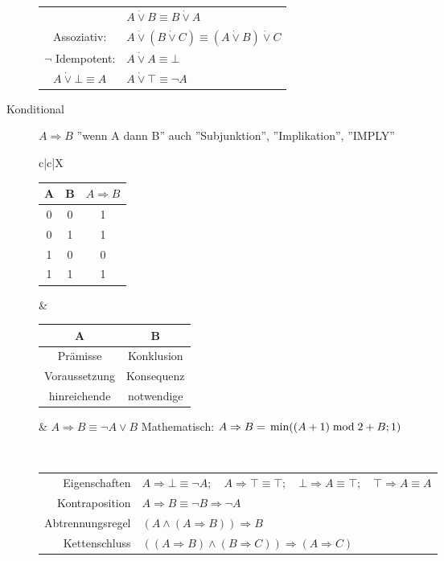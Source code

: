 \documentclass[12pt,a4paper]{article}
\begin{document}
\begin{description}
\begin{description}
\begin{tabularx}{\linewidth}{c|X}
\begin{tabular}[t]{ll}
						Kommutativ:                  & $A \dot{\vee} B \equiv B \dot{\vee} A$                               \\
						Assoziativ:                  & $A \dot{\vee} (B \dot{\vee} C) \equiv (A \dot{\vee} B) \dot{\vee} C$ \\
						$\neg$ Idempotent:           & $A \dot{\vee} A \equiv \bot$                                         \\
						$A \dot{\vee} \bot \equiv A$ & $A \dot{\vee} \top \equiv \neg A$
					\end{tabular} \\ \hline
				\end{tabularx}
			\item[Konditional] $A\Rightarrow B$ ''wenn A dann B'' auch ''Subjunktion'', ''Implikation'', ''IMPLY'' \\
				\begin{tabularx}{\linewidth}{c|c|X}
					\begin{tabular}[t]{c|c||c}
						A & B & $A \Rightarrow B$ \\ \hline\hline
						0 & 0 & 1                 \\ \hline
						0 & 1 & 1                 \\ \hline
						1 & 0 & 0                 \\ \hline
						1 & 1 & 1
					\end{tabular} &
					\begin{tabular}[t]{c|c}
						A             & B          \\ \hline
						Prämisse      & Konklusion \\
						Voraussetzung & Konsequenz \\
						hinreichende  & notwendige
					\end{tabular}      &
					$A \Rightarrow B \equiv \neg A \vee B$ \newline
					Mathematisch: $A \Rightarrow B = \newline \min((A + 1) \bmod 2 + B; 1)$ \\ \hline
				\end{tabularx} \\
				\begin{tabular}[t]{rl}
					Eigenschaften    & $A \Rightarrow \bot \equiv \neg A; \quad A \Rightarrow \top \equiv \top; \quad \bot \Rightarrow A \equiv \top; \quad \top \Rightarrow A \equiv A$ \\
					Kontraposition   & $A \Rightarrow B \equiv \neg B \Rightarrow \neg A$                                                                                                \\
					Abtrennungsregel & $(A \wedge (A \Rightarrow B)) \Rightarrow B$                                                                                                      \\
					Kettenschluss    & $((A \Rightarrow B) \wedge (B \Rightarrow C)) \Rightarrow (A \Rightarrow C)$
				\end{tabular}


\end{description}
\end{description}
\end{document}
